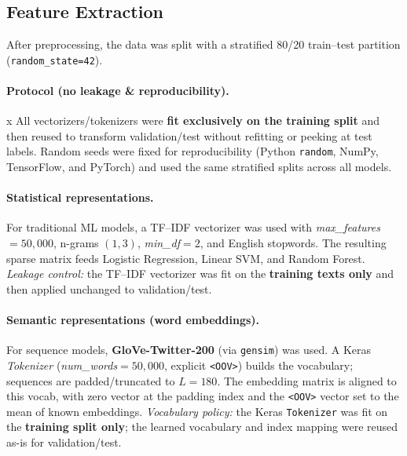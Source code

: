 \documentclass[10pt]{article}
\begin{document}
\subsection{Feature Extraction}
After preprocessing, the data was split with a stratified 80/20 train--test partition (\texttt{random\_state=42}).

\paragraph{Protocol (no leakage \& reproducibility).}x
All vectorizers/tokenizers were \textbf{fit exclusively on the training split} and then reused to transform
validation/test without refitting or peeking at test labels. Random seeds were fixed for reproducibility
(Python \texttt{random}, NumPy, TensorFlow, and PyTorch) and used the same stratified splits across all models.

\paragraph{Statistical representations.}
For traditional ML models, a TF--IDF vectorizer was used with \textit{max\_features} $=50{,}000$, n-grams $(1,3)$, \textit{min\_df}$=2$, and English stopwords. The resulting sparse matrix feeds Logistic Regression, Linear SVM, and Random Forest.
\textit{Leakage control:} the TF--IDF vectorizer was fit on the \textbf{training texts only} and then applied
unchanged to validation/test.

\paragraph{Semantic representations (word embeddings).}
For sequence models, \textbf{GloVe-Twitter-200} (via \texttt{gensim}) was used. A Keras \textit{Tokenizer} (\textit{num\_words}$=50{,}000$, explicit \texttt{<OOV>}) builds the vocabulary; sequences are padded/truncated to $L=180$. The embedding matrix is aligned to this vocab, with zero vector at the padding index and the \texttt{<OOV>} vector set to the mean of known embeddings.
\textit{Vocabulary policy:} the Keras \texttt{Tokenizer} was fit on the \textbf{training split only};
the learned vocabulary and index mapping were reused as-is for validation/test.
\end{document}
